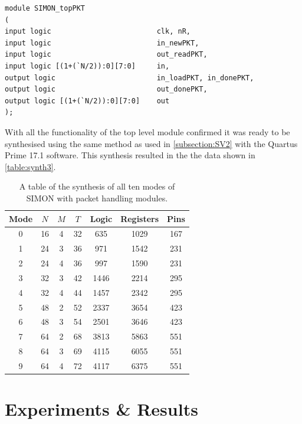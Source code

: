 \documentclass[12pt,twoside,a4paper]{report}
\begin{document}
 	\begin{minipage}{\linewidth}
	\begin{lstlisting}[label={lst:top_io},caption={The inputs and output of the tope level module.},style=SVStyle]
module SIMON_topPKT
(
input logic							clk, nR,
input logic							in_newPKT,
input logic							out_readPKT,
input logic [(1+(`N/2)):0][7:0]		in,
output logic 						in_loadPKT, in_donePKT,
output logic						out_donePKT,
output logic [(1+(`N/2)):0][7:0]	out
);
	\end{lstlisting}
	\end{minipage}

	With all the functionality of the top level module confirmed it was ready to be synthesised using the same method as used in \autoref{subsection:SV2} with the Quartus Prime 17.1 software. This synthesis resulted in the the data shown in \autoref{table:synth3}.
	
	\begin{table}[H]
	\centering
	\begin{tabular}{||c|c|c|c|c|c|c||}
		\hline \hline
		Mode  & $N$ & $M$ & $T$ & Logic & Registers & Pins\\
		\hline \hline
		0 & 16 & 4 & 32 & 635 & 1029 & 167 \\
		\hline
		1 & 24 & 3 & 36 & 971	& 1542 & 231  \\
		2 & 24 & 4 & 36 & 997 &	1590 & 231  \\
		\hline
		3 & 32 & 3 & 42 & 1446 & 2214 &	295  \\
		4 & 32 & 4 & 44 & 1457 & 2342 &	295	\\
		\hline
		5 & 48 & 2 & 52 & 2337 & 3654 &	423  \\
		6 & 48 & 3 & 54 & 2501 & 3646 & 423 \\
		\hline
		7 & 64 & 2 & 68 & 3813 & 5863 & 551  \\
		8 & 64 & 3 & 69 & 4115 & 6055 & 551 \\
 		9 & 64 & 4 & 72 & 4117 & 6375 &	551 \\
		\hline \hline
	\end{tabular}
	\caption{A table of the synthesis of all ten modes of SIMON with packet handling modules.}
	\label{table:synth3}
	\end{table}

	\chapter{Experiments \& Results}
	\label{chapter:RESULT}
	
\end{document}
